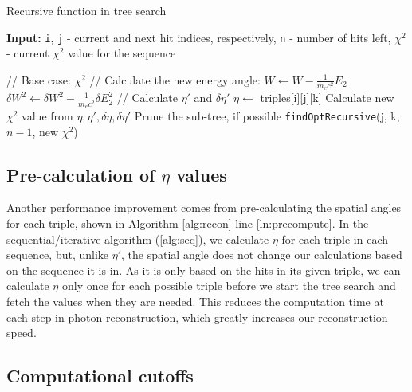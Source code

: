 \begin{algorithm}
\caption{Recursive function in tree search}\label{alg:recurse}
\hspace{\algorithmicindent} \textbf{Input:} \texttt{i}, \texttt{j} - current and next hit indices, respectively, \texttt{n} - number of hits left, $\chi^2$ - current $\chi^2$ value for the sequence
\begin{algorithmic}[1]
    \State // Base case:
     \label{ln:hitsUsed}
        \State \Return $\chi^2$
    \EndIf
    \State
        \State // Calculate the new energy angle:
        \State $W \gets W - \frac{1}{m_e c^2}E_2$ 
        \State $\delta W^2 \gets \delta W^2 - \frac{1}{m_e c^2}\delta E_2^2$
        \State
        \State // Calculate $\eta'$ and $\delta \eta'$ 
        \State $\eta \gets$ triples[i][j][k] 
        \State
        \State Calculate new $\chi^2$ value from $\eta, \eta', \delta\eta, \delta\eta'$  \label{ln:chi2}
        \State
        \State Prune the sub-tree, if possible 
        \State
        \State \texttt{findOptRecursive}(j, k, $n-1$, new $\chi^2$) 
    \EndFor
\EndFunction
\end{algorithmic}
\end{algorithm}

\subsection{Pre-calculation of $\eta$ values}
Another performance improvement comes from pre-calculating the spatial angles for each triple, shown in Algorithm \ref{alg:recon} line \ref{ln:precompute}. In the sequential/iterative algorithm (\ref{alg:seq}), we calculate $\eta$ for each triple in each sequence, but, unlike $\eta'$, the spatial angle does not change our calculations based on the sequence it is in. As it is only based on the hits in its given triple, we can calculate $\eta$ only once for each possible triple before we start the tree search and fetch the values when they are needed. This reduces the computation time at each step in photon reconstruction, which greatly increases our reconstruction speed.

\subsection{Computational cutoffs} \label{pruning}

